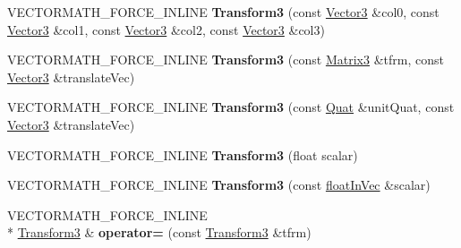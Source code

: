 \begin{DoxyCompactItemize}
\item 
\hypertarget{class_vectormath_1_1_aos_1_1_transform3_aede20208cca61cb3153849707fcd05c7}{V\+E\+C\+T\+O\+R\+M\+A\+T\+H\+\_\+\+F\+O\+R\+C\+E\+\_\+\+I\+N\+L\+I\+N\+E {\bfseries Transform3} (const \hyperlink{class_vectormath_1_1_aos_1_1_vector3}{Vector3} \&col0, const \hyperlink{class_vectormath_1_1_aos_1_1_vector3}{Vector3} \&col1, const \hyperlink{class_vectormath_1_1_aos_1_1_vector3}{Vector3} \&col2, const \hyperlink{class_vectormath_1_1_aos_1_1_vector3}{Vector3} \&col3)}\label{class_vectormath_1_1_aos_1_1_transform3_aede20208cca61cb3153849707fcd05c7}

\item 
\hypertarget{class_vectormath_1_1_aos_1_1_transform3_a48b610b8feeb0c9a3e93ee050c7c1c6f}{V\+E\+C\+T\+O\+R\+M\+A\+T\+H\+\_\+\+F\+O\+R\+C\+E\+\_\+\+I\+N\+L\+I\+N\+E {\bfseries Transform3} (const \hyperlink{class_vectormath_1_1_aos_1_1_matrix3}{Matrix3} \&tfrm, const \hyperlink{class_vectormath_1_1_aos_1_1_vector3}{Vector3} \&translate\+Vec)}\label{class_vectormath_1_1_aos_1_1_transform3_a48b610b8feeb0c9a3e93ee050c7c1c6f}

\item 
\hypertarget{class_vectormath_1_1_aos_1_1_transform3_a54f039ec2e81b7a889897e2e363b8b0a}{V\+E\+C\+T\+O\+R\+M\+A\+T\+H\+\_\+\+F\+O\+R\+C\+E\+\_\+\+I\+N\+L\+I\+N\+E {\bfseries Transform3} (const \hyperlink{class_vectormath_1_1_aos_1_1_quat}{Quat} \&unit\+Quat, const \hyperlink{class_vectormath_1_1_aos_1_1_vector3}{Vector3} \&translate\+Vec)}\label{class_vectormath_1_1_aos_1_1_transform3_a54f039ec2e81b7a889897e2e363b8b0a}

\item 
\hypertarget{class_vectormath_1_1_aos_1_1_transform3_a3cb83ed1cf9176ab1ac5b0392d48a9f3}{V\+E\+C\+T\+O\+R\+M\+A\+T\+H\+\_\+\+F\+O\+R\+C\+E\+\_\+\+I\+N\+L\+I\+N\+E {\bfseries Transform3} (float scalar)}\label{class_vectormath_1_1_aos_1_1_transform3_a3cb83ed1cf9176ab1ac5b0392d48a9f3}

\item 
\hypertarget{class_vectormath_1_1_aos_1_1_transform3_a17e9be3eba2cb81725a902d59eeb3fce}{V\+E\+C\+T\+O\+R\+M\+A\+T\+H\+\_\+\+F\+O\+R\+C\+E\+\_\+\+I\+N\+L\+I\+N\+E {\bfseries Transform3} (const \hyperlink{class_vectormath_1_1float_in_vec}{float\+In\+Vec} \&scalar)}\label{class_vectormath_1_1_aos_1_1_transform3_a17e9be3eba2cb81725a902d59eeb3fce}

\item 
\hypertarget{class_vectormath_1_1_aos_1_1_transform3_aaf980c7bc78620562ddff8728be1e1fd}{V\+E\+C\+T\+O\+R\+M\+A\+T\+H\+\_\+\+F\+O\+R\+C\+E\+\_\+\+I\+N\+L\+I\+N\+E \\*
\hyperlink{class_vectormath_1_1_aos_1_1_transform3}{Transform3} \& {\bfseries operator=} (const \hyperlink{class_vectormath_1_1_aos_1_1_transform3}{Transform3} \&tfrm)}\label{class_vectormath_1_1_aos_1_1_transform3_aaf980c7bc78620562ddff8728be1e1fd}


\end{DoxyCompactItemize}
